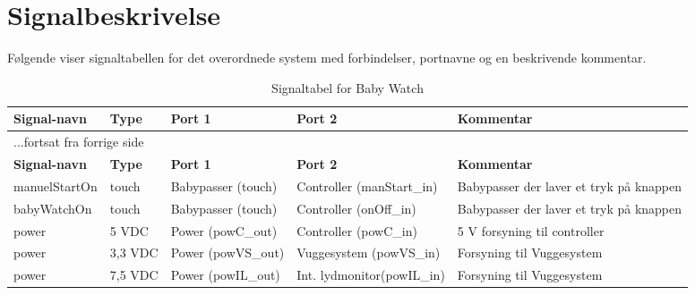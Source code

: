 

\section{Signalbeskrivelse} \label{overordnet:signalbeskrivelse}

Følgende viser  signaltabellen for det overordnede system  med forbindelser, portnavne og en beskrivende kommentar.

\begin{center}
\label{overordnet:signaltabel}
\begin{longtable}{|p{}|p{}|p{}|p{}|p{3cm}|}
\caption{Signaltabel for Baby Watch}\\
\hline
\textbf{Signal-navn}	&\textbf{Type} 		&\textbf{Port 1} 	&\textbf{Port 2} 			&\textbf{Kommentar} \\ \hline
\endfirsthead
\multicolumn{5}{l}{...fortsat fra forrige side} \\ \hline 
\textbf{Signal-navn}	&\textbf{Type} 		&\textbf{Port 1} 	&\textbf{Port 2} 			&\textbf{Kommentar} \\ \hline
\endhead


manuelStartOn
&touch
&Babypasser \newline (touch)
&Controller \newline (manStart\_in)
&Babypasser der laver et tryk på knappen
\\\hline

babyWatchOn
&touch
&Babypasser \newline (touch)
&Controller \newline (onOff\_in)
&Babypasser der laver et tryk på knappen
\\\hline

power
&5 VDC
&Power \newline(powC\_out)
&Controller \newline(powC\_in)
&5 V forsyning til controller
\\\hline

power
&3,3 VDC
&Power \newline(powVS\_out)
&Vuggesystem \newline(powVS\_in)
&Forsyning til Vuggesystem
\\\hline

power
&7,5 VDC
&Power \newline(powIL\_out)
&Int. lydmonitor\newline(powIL\_in)
&Forsyning til Vuggesystem
\\\hline


\end{longtable}
\end{center}
